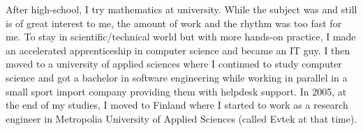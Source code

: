 After high-school, I try mathematics at university. While the subject was and still is of great interest to me, the amount of work and the rhythm was too fast for me. 
To stay in scientific/technical world but with more hands-on practice, I made an accelerated apprenticeship in computer science and became an IT guy. 
I then moved to a university of applied sciences where I continued to study computer science and got a bachelor in software engineering while working in parallel in a small sport import company providing them with helpdesk support.
In 2005, at the end of my studies, I moved to Finland where I started to work as a research engineer in Metropolia University of Applied Sciences (called Evtek at that time).
